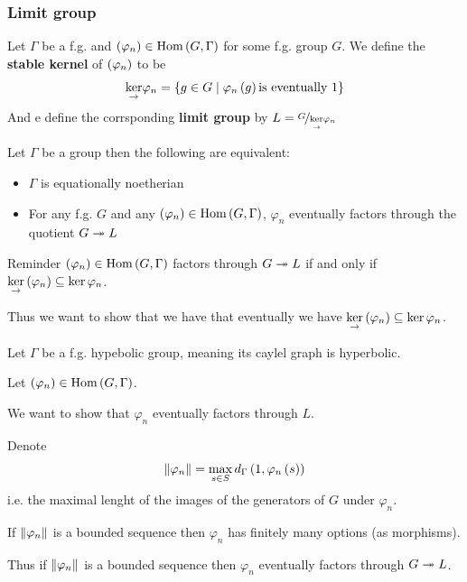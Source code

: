 \documentclass[handout]{beamer}[10]
\renewcommand{\hom}{\text{Hom}}
\begin{document}
\begin{frame}
    \frametitle{Limit group}
\pause 
    \begin{definition}\pause
        Let $\Gamma$ be a f.g. \pause  and $\rb{\varphi_n} \in \hom\rb{G,\Gamma}$ for some f.g. group $G$. \pause
        We define the \textbf{stable kernel} of $\left( \varphi_n \right)$ to be
        \begin{equation*}
            \underset{\rightarrow}{\ker}{\varphi_n} = \left\{ g\in G \mid \varphi_n \left( g \right) \text{is eventually } 1 \right\}
        \end{equation*}
        And e define the corrsponding \textbf{limit group} by $L=\nicefrac{G}{\underset{\rightarrow}{\ker}{\varphi_n}}$
    \end{definition}
    \pause
    \begin{lemma}
        Let $\Gamma$ be a group then the following are equivalent:

        \begin{itemize}
            \item $\Gamma$ is equationally noetherian
            \pause \item For any f.g. $G$ and any $\rb{\varphi_n} \in \hom\rb{G,\Gamma}$, \pause $\varphi_n$ eventually factors through the
            quotient $G\twoheadrightarrow L$
        \end{itemize}

    \end{lemma}
\end{frame}

\begin{frame}
    \begin{block}{Reminder}
        $\rb{\varphi_n} \in \hom\rb{G,\Gamma}$ factors through $G\twoheadrightarrow L$ if and only if $\underset{\rightarrow}{\ker}\left( \varphi_n \right) \subseteq \ker \varphi_n $. 
        
        Thus we want to show that we have that eventually we have $\underset{\rightarrow}{\ker}\left( \varphi_n \right) \subseteq \ker \varphi_n $.
    \end{block}
\end{frame}

\begin{frame}

    Let $\Gamma$ be a f.g. hypebolic group, meaning its caylel graph is hyperbolic.
    
    \pause Let $\rb{\varphi_n} \in \hom\rb{G,\Gamma}$. 
    
    \pause We want to show that $\varphi_n$ eventually factors through $L$.
    
    \pause Denote 
    \begin{equation*}
        \lVert \varphi_n \rVert = \max_{s\in S} d_\Gamma \left( 1,\varphi_n\left(  s  \right) \right)
    \end{equation*}\pause
    i.e. the maximal lenght of the images of the generators of $G$ under $\varphi_n$.\pause
    \begin{fact}
        If $\lVert \varphi_n \rVert$ is a bounded sequence then $\varphi_n$ has finitely many options (as morphisms).
        
        Thus if $\lVert \varphi_n \rVert$ is a bounded sequence then $\varphi_n$ eventually factors through $G\twoheadrightarrow L$.
    \end{fact}

\end{frame}
\end{document}
